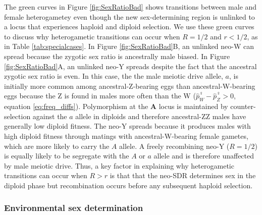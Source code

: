 \documentclass[12pt]{article}
\begin{document}
The green curves in Figure \ref{fig:SexRatioBad} shows transitions between male and female heterogametey even though the new sex-determining region is unlinked to a locus that experiences haploid and diploid selection. 
We use these green curves to discuss why heterogametic transitions can occur when $R=1/2$ and $r<1/2$, as in Table \ref{tab:specialcases}.
In Figure \ref{fig:SexRatioBad}B, an unlinked neo-W can spread because the zygotic sex ratio is ancestrally male biased. 
In Figure \ref{fig:SexRatioBad}A, an unlinked neo-Y spreads despite the fact that the ancestral zygotic sex ratio is even. 
In this case, the the male meiotic drive allele, $a$, is initially more common among ancestral-Z-bearing eggs than ancestral-W-bearing eggs because the Z is found in males more often than the W ($\hat{p}_{W}^\female-\hat{p}_{Z}^\female>0$, equation \ref{eq:freq_diffs}). 
Polymorphism at the \textbf{A} locus is maintained by counter-selection against the $a$ allele in diploids and therefore ancestral-ZZ males have generally low diploid fitness. 
The neo-Y spreads because it produces males with high diploid fitness through matings with ancestral-W-bearing female gametes, which are more likely to carry the $A$ allele. 
A freely recombining neo-Y ($R=1/2$) is equally likely to be segregate with the $A$ or $a$ allele and is therefore unaffected by male meiotic drive.
Thus, a key factor in explaining why heterogametic transitions can occur when $R>r$ is that that the neo-SDR determines sex in the diploid phase but recombination occurs before any subsequent haploid selection. 


\subsubsection*{Environmental sex determination}
\end{document}
